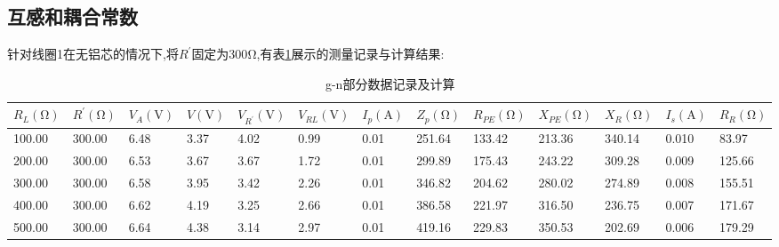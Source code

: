 \documentclass[UTF8,a4paper]{article}%
\begin{document}
\subsection{互感和耦合常数}
针对线圈1在无铝芯的情况下,将$R^\prime$固定为300$\unit{\ohm}$,有表\ref{tb:g-n}展示的测量记录与计算结果:

\begin{table}[H]
    \centering
    \caption{g-n部分数据记录及计算}
    \label{tb:g-n}
    \begin{tabular}{lllllllllllll}
        \hline
        $R_L(\unit{\ohm})$ & $R^\prime(\unit{\ohm})$ & $V_A(\unit{\volt})$ & $V(\unit{\volt})$ & $V_{R^\prime}(\unit{\volt})$ & $V_{RL}(\unit{\volt})$ & $I_p(\unit{\A})$ & $Z_p(\unit{\ohm})$ & $R_{PE}(\unit{\ohm})$ & $X_{PE}(\unit{\ohm})$ & $X_R(\unit{\ohm})$ & $I_s(\unit{\A})$ & $R_R(\unit{\ohm})$ \\
        \hline
        100.00             & 300.00                  & 6.48                & 3.37              & 4.02                         & 0.99                   & 0.01             & 251.64             & 133.42                & 213.36                & 340.14             & 0.010            & 83.97              \\
        200.00             & 300.00                  & 6.53                & 3.67              & 3.67                         & 1.72                   & 0.01             & 299.89             & 175.43                & 243.22                & 309.28             & 0.009            & 125.66             \\
        300.00             & 300.00                  & 6.58                & 3.95              & 3.42                         & 2.26                   & 0.01             & 346.82             & 204.62                & 280.02                & 274.89             & 0.008            & 155.51             \\
        400.00             & 300.00                  & 6.62                & 4.19              & 3.25                         & 2.66                   & 0.01             & 386.58             & 221.97                & 316.50                & 236.75             & 0.007            & 171.67             \\
        500.00             & 300.00                  & 6.64                & 4.38              & 3.14                         & 2.97                   & 0.01             & 419.16             & 229.83                & 350.53                & 202.69             & 0.006            & 179.29             \\

\end{tabular}
\end{table}
\end{document}
